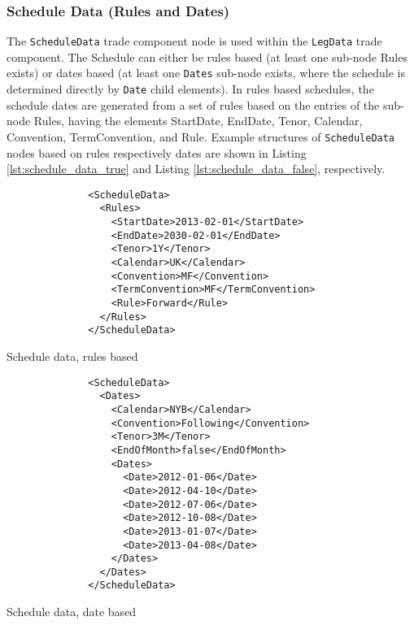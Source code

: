\subsubsection{Schedule Data (Rules and Dates)}\label{ss:schedule_data}

The \lstinline!ScheduleData! trade component node is used within the \lstinline!LegData! trade component. The Schedule can either be
rules based (at least one sub-node Rules exists) or dates based (at least one \lstinline!Dates! sub-node exists,
where the schedule is determined directly by \lstinline!Date! child elements). In rules based schedules, the schedule dates are generated from a
set of rules based on the entries of the sub-node Rules, having the elements StartDate, EndDate, Tenor, Calendar, Convention, TermConvention, and Rule.
Example structures of \lstinline!ScheduleData! nodes based on rules
respectively dates are shown in Listing \ref{lst:schedule_data_true} and Listing \ref{lst:schedule_data_false}, respectively.

\begin{listing}[H]
\begin{verbatim}
              <ScheduleData>
                <Rules>
                  <StartDate>2013-02-01</StartDate>
                  <EndDate>2030-02-01</EndDate>
                  <Tenor>1Y</Tenor>
                  <Calendar>UK</Calendar>
                  <Convention>MF</Convention>
                  <TermConvention>MF</TermConvention>
                  <Rule>Forward</Rule>
                </Rules>
              </ScheduleData>
\end{verbatim}
\caption{Schedule data, rules based}
\label{lst:schedule_data_true}
\end{listing}

\begin{listing}[H]
\begin{verbatim}
              <ScheduleData>
                <Dates>
                  <Calendar>NYB</Calendar>
                  <Convention>Following</Convention>
                  <Tenor>3M</Tenor>
                  <EndOfMonth>false</EndOfMonth>
                  <Dates>
                    <Date>2012-01-06</Date>
                    <Date>2012-04-10</Date>
                    <Date>2012-07-06</Date>
                    <Date>2012-10-08</Date>
                    <Date>2013-01-07</Date>
                    <Date>2013-04-08</Date>
                  </Dates>
                </Dates> 
              </ScheduleData>
\end{verbatim}
\caption{Schedule data, date based}
\label{lst:schedule_data_false}
\end{listing}

